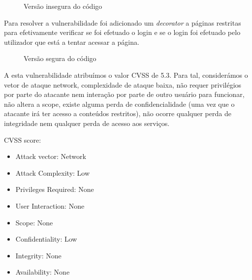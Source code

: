 \documentclass[12pt]{report}
\begin{document}
\begin{figure}[H]{
\centering
{
\caption{Versão insegura do código}
}
}\end{figure}

Para resolver a vulnerabilidade foi adicionado um \emph{decorator} a páginas restritas para efetivamente verificar se foi efetuado o login e se o login foi efetuado pelo utilizador que está a tentar acessar a página.

\begin{figure}[H]{
\centering
{
\caption{Versão segura do código}
}
}\end{figure}

\newpage
A esta vulnerabilidade atribuímos o valor CVSS de 5.3. Para tal, considerámos o vetor de ataque network, complexidade de ataque baixa, não requer privilégios por parte do atacante nem interação por parte de outro usuário para funcionar, não altera a scope, existe alguma perda de confidencialidade (uma vez que o atacante irá ter acesso a conteúdos restritos), não ocorre qualquer perda de integridade nem qualquer perda de acesso aos serviços.\par
CVSS score: \begin{itemize}
  \item Attack vector: Network
  \item Attack Complexity: Low
  \item Privileges Required: None
  \item User Interaction: None
  \item Scope: None
  \item Confidentiality: Low
  \item Integrity: None
  \item Availability: None
\end{itemize}
\newpage
\end{document}
